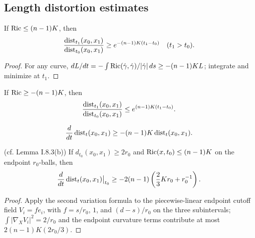\subsection{Length distortion estimates}
\label{secI.8.3}
\begin{lemma}
  \label{lem:kl-length-distortion-estimates-length-distortion-estimates-lemma}
  \label{crudelemma}
If $\operatorname{Ric}\le(n-1)K$, then
\begin{equation}{\operatorname{dist}_{t_1}(x_0,x_1)\over\operatorname{dist}_{t_0}(x_0,x_1)}\ge e^{-(n-1)K(t_1-t_0)}\quad(t_1>t_0).
\end{equation}
\end{lemma}
\begin{proof}
\sketch
For any curve, $dL/dt=-\int\operatorname{Ric}(\dot\gamma,\dot\gamma)/|\dot\gamma|\,ds\ge-(n-1)KL$;
integrate and minimize at $t_1$.
\end{proof}
\begin{remark}
  \label{rem:kl-length-distortion-estimates-structural-remark-length-distortion-estimates}
  \label{similar}
If $\operatorname{Ric}\ge-(n-1)K$, then
\begin{equation}{\operatorname{dist}_{t_1}(x_0,x_1)\over\operatorname{dist}_{t_0}(x_0,x_1)}\le e^{(n-1)K(t_1-t_0)}.\end{equation}
\end{remark}
\begin{equation}\label{conclusion}{d\over dt}\operatorname{dist}_t(x_0,x_1)\ge-(n-1)K\operatorname{dist}_t(x_0,x_1).\end{equation}
\begin{lemma}
  \label{lem:kl-length-distortion-estimates-distance-distortion-lemma}
  \label{distancedist} (cf. Lemma I.8.3(b))
If $d_{t_0}(x_0,x_1)\ge2r_0$ and $\operatorname{Ric}(x,t_0)\le(n-1)K$ on the endpoint
$r_0$-balls, then
\begin{equation}{d\over dt}\operatorname{dist}_t(x_0,x_1)\big|_{t_0}\ge-2(n-1)\left({2\over3}Kr_0+r_0^{-1}\right).
\end{equation}
\end{lemma}
\begin{proof}
\sketch
Apply the second variation formula to the piecewise-linear endpoint cutoff field
$V_i=f e_i$, with $f=s/r_0$, $1$, and $(d-s)/r_0$ on the three subintervals;
$\int|\nabla_XV_i|^2=2/r_0$ and the endpoint curvature terms contribute at most
$2(n-1)K(2r_0/3)$.
\end{proof}
